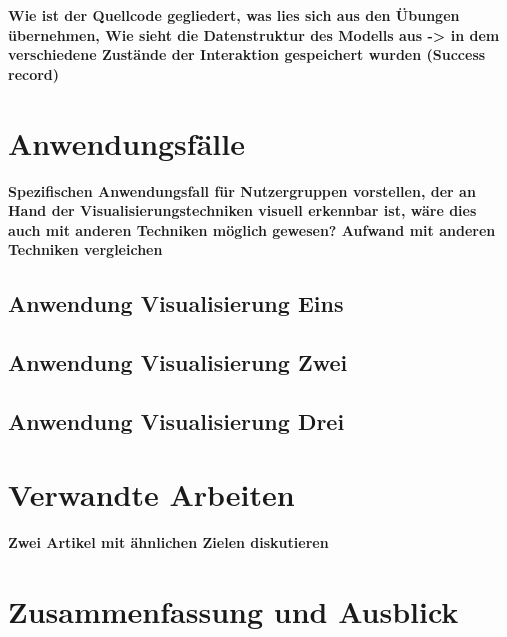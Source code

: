 \documentclass[usegeometry=true]{scrartcl}
\begin{document}
\textbf{Wie ist der Quellcode gegliedert, was lies sich aus den Übungen übernehmen, Wie sieht die Datenstruktur des Modells aus -> in dem verschiedene Zustände der Interaktion gespeichert wurden (Success record)}

\section{Anwendungsfälle}

\textbf{Spezifischen Anwendungsfall für Nutzergruppen vorstellen, der an Hand der Visualisierungstechniken visuell erkennbar ist, wäre dies auch mit anderen Techniken möglich gewesen? Aufwand mit anderen Techniken vergleichen}
\subsection{Anwendung Visualisierung Eins}



\subsection{Anwendung Visualisierung Zwei}


\subsection{Anwendung Visualisierung Drei}

\section{Verwandte Arbeiten}
\textbf{Zwei Artikel mit ähnlichen Zielen diskutieren}
\section{Zusammenfassung und Ausblick}
\end{document}
